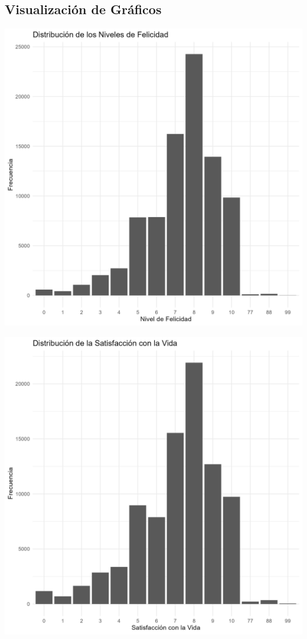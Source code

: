 \documentclass{article}\usepackage[]{graphicx}\usepackage[]{xcolor}
\makeatletter
\def\maxwidth{ %
  \ifdim\Gin@nat@width>\linewidth
    \linewidth
  \else
    \Gin@nat@width
  \fi
}
\makeatother
\begin{document}
\subsection{Visualización de Gráficos}


\includegraphics[width=\maxwidth]{distribucion_felicidad} 

\includegraphics[width=\maxwidth]{distribucion_satisfaccion_vida} 
\end{document}
